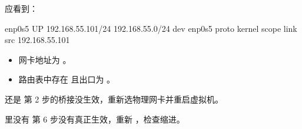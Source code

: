 应看到：

\begin{command}
enp0s5   UP   192.168.55.101/24
192.168.55.0/24 dev enp0s5 proto kernel scope link src 192.168.55.101
\end{command}

\begin{expected}
\begin{itemize}
\item 网卡地址为 。
\item 路由表中存在  且出口为 。
\end{itemize}
\end{expected}

\begin{faq}{ 还是 }
第 2 步的桥接没生效，重新选物理网卡并重启虚拟机。
\end{faq}
\begin{faq}{ 里没有 }
第 6 步没有真正生效，重新 ，检查缩进。
\end{faq}
